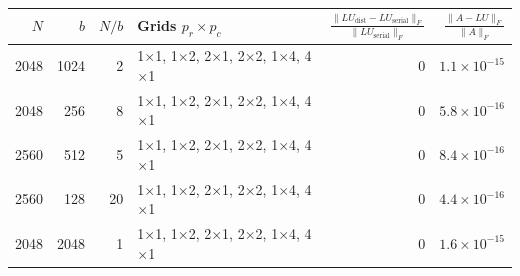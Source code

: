 \begin{tabular}{rrrlrr}
\toprule
$N$ & $b$ & $N/b$ & Grids $p_r \times p_c$ & $\frac{\|LU_{\mathrm{dist}} - LU_{\mathrm{serial}}\|_F}{\|LU_{\mathrm{serial}}\|_F}$ & $\frac{\|A - LU\|_F}{\|A\|_F}$ \\
\midrule
2048 & 1024 & 2 & 1$\times$1, 1$\times$2, 2$\times$1, 2$\times$2, 1$\times$4, 4$\times$1 & 0 & $1.1 \times 10^{-15}$ \\
2048 & 256 & 8 & 1$\times$1, 1$\times$2, 2$\times$1, 2$\times$2, 1$\times$4, 4$\times$1 & 0 & $5.8 \times 10^{-16}$ \\
2560 & 512 & 5 & 1$\times$1, 1$\times$2, 2$\times$1, 2$\times$2, 1$\times$4, 4$\times$1 & 0 & $8.4 \times 10^{-16}$ \\
2560 & 128 & 20 & 1$\times$1, 1$\times$2, 2$\times$1, 2$\times$2, 1$\times$4, 4$\times$1 & 0 & $4.4 \times 10^{-16}$ \\
2048 & 2048 & 1 & 1$\times$1, 1$\times$2, 2$\times$1, 2$\times$2, 1$\times$4, 4$\times$1 & 0 & $1.6 \times 10^{-15}$ \\
\bottomrule
\end{tabular}

